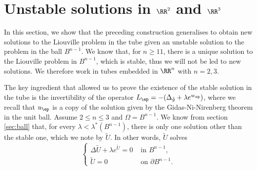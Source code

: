 \section{Unstable solutions in $\RR^2$ and $\RR^3$}

In this section, we show that the preceding construction generalises to obtain
new solutions to the Liouville problem in the tube given an unstable solution to
the problem in the ball $B^{n-1}$. We know that, for $n\geq 11$, there is a
unique solution to the Liouville problem in $B^{n-1}$, which is stable, thus we
will not be led to new solutions. We therefore work in tubes embedded in
$\RR^n$ with $n=2,3$.

The key ingredient that allowed us to prove the existence of the stable solution
in the tube is the invertibility of the operator $L_\ep=-(\Delta_{\mathring
g}+\lambda e^{u_\ep})$, where we recall that $u_\ep$ is a copy of the solution
given by the Gidas-Ni-Nirenberg theorem in the unit ball. Assume $2\leq n\leq 3$
and $\Omega=B^{n-1}$. We know from section \ref{sec:ball} that, for every
$\lambda < \lambda^\ast(B^{n-1})$, there is only one solution other than the
stable one, which we note by $\tilde U$. In other words, $\tilde U$ solves
\begin{equation}
\label{eq:u-tilde}
\left\{
\begin{array}{cc}
\Delta \tilde U + \lambda e^{\tilde U}=0 & \mbox{ in }B^{n-1},\\
\tilde U = 0 &\mbox{ on }\partial B^{n-1}.
\end{array}
\right.
\end{equation}

